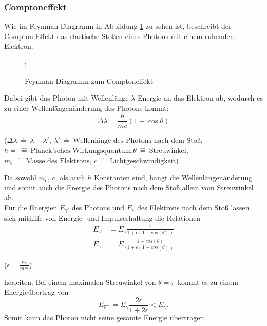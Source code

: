 \subsubsection{Comptoneffekt}
Wie im Feynman-Diagramm in Abbildung \ref{fig:compton} zu sehen ist, beschreibt der Compton-Effekt das elastische Stoßen eines Photons mit einem ruhenden Elektron.
\begin{figure}[H]
\centering
{};
\caption{Feynman-Diagramm zum Comptoneffekt}
\label{fig:compton}
\end{figure}
Dabei gibt das Photon mit Wellenlänge $\lambda$ Energie an das Elektron ab, wodurch es zu einer Wellenlängenänderung des Photons kommt:
\begin{equation}
  \Delta \lambda = \frac{h}{mc}\left( 1-\cos{\theta} \right)
\end{equation}
\begin{center}
    \tiny {($\Delta \lambda \: \hat{=} \: \lambda - \lambda '$, $ \lambda '\: \hat{=} \:\text{Wellenlänge des Photons nach dem Stoß}$, $h=\: \hat{=} \:\text{Planck'sches Wirkungsquantum}$,$\theta\: \hat{=} \:\text{Streuwinkel}$, $m_\text{e} \: \hat{=} \:\text{Masse des Elektrons}$, $c \: \hat{=} \: \text{Lichtgeschwindigkeit}$)}
\end{center}
Da sowohl $m_\text{e}$, $c$, als auch $h$ Konstanten sind, hängt die Wellenlängenänderung und somit auch die Energie des Photons nach dem Stoß allein vom Streuwinkel ab.\\
Für die Energien $E_{\gamma'}$ des Photons und $E_e$ des Elektrons nach dem Stoß lassen sich mithilfe von Energie- und Impulserhaltung die Relationen 
\begin{align}
    E_{\gamma'} &= E_\gamma \frac{1}{1+\epsilon (1-cos(\theta))}\\
    E_e &= E_\gamma \frac{1-cos(\theta)}{1+\epsilon (1-cos(\theta))}
\end{align} 
\begin{center}
    \tiny{($\epsilon = \frac{E_\gamma}{mc^2}$)}
\end{center}
herleiten. Bei einem maximalen Streuwinkel von $\theta = \pi$ kommt es zu einem Energieübertrag von 
\begin{equation}
    E_\text{EL} = E_\gamma \frac{2 \epsilon}{1 + 2 \epsilon} < E_\gamma .
\end{equation}
Somit kann das Photon nicht seine gesamte Energie übertragen.

